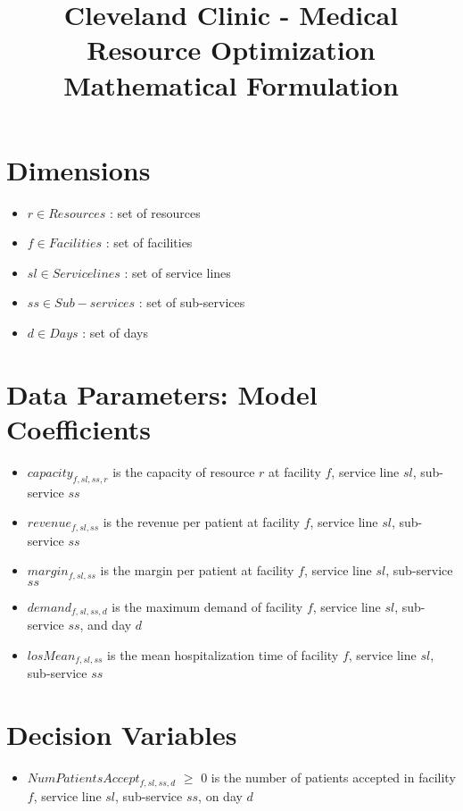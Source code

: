 \documentclass[10pt, letterpaper]{article}
\begin{document}
\title{Cleveland Clinic - Medical Resource Optimization Mathematical Formulation}
\maketitle


\section*{Dimensions}
\begin{itemize}
\item[ ] $ r \in Resources$ : set of resources
\item[ ] $ f \in Facilities$ : set of facilities
\item[ ] $ sl \in Service lines$ : set of service lines
\item[ ] $ ss \in Sub-services$ : set of sub-services
\item[ ] $ d \in Days$ : set of days
\end{itemize}

\section*{Data Parameters: Model Coefficients}
\begin{itemize}
\item[ ] $capacity_{f,sl,ss,r}$  is the capacity of resource $r$ at facility $f$, service line $sl$, sub-service $ss$
\item[ ] $revenue_{f,sl,ss}$  is the revenue per patient at facility $f$, service line $sl$, sub-service $ss$
\item[ ] $margin_{f,sl,ss}$  is the margin per patient at facility $f$, service line $sl$, sub-service $ss$
\item[ ] $demand_{f,sl,ss,d}$  is the maximum demand of facility $f$, service line $sl$, sub-service $ss$, and day $d$
\item[ ] $losMean_{f,sl,ss}$  is the mean hospitalization time of facility $f$, service line $sl$, sub-service $ss$
\end{itemize}

\section*{Decision Variables}
\begin{itemize}
\item [ ] $NumPatientsAccept_{f,sl,ss,d}$ $\geq$ {0} is the number of patients accepted in facility $f$, service line $sl$, sub-service $ss$, on day $d$
\end{itemize}
\end{document}
